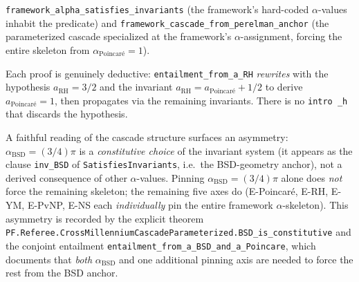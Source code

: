 \begin{definition}
\begin{itemize}
\texttt{framework\_\allowbreak{}alpha\_\allowbreak{}satisfies\_\allowbreak{}invariants} (the framework's
hard-coded $\alpha$-values inhabit the predicate) and
\texttt{framework\_\allowbreak{}cascade\_\allowbreak{}from\_\allowbreak{}perelman\_\allowbreak{}anchor} (the
parameterized cascade specialized at the framework's
$\alpha$-assignment, forcing the entire skeleton from
$\alpha_{\text{Poincar\'e}} = 1$).
\end{itemize}
Each proof is genuinely deductive: \texttt{entailment\_from\_a\_RH}
\emph{rewrites} with the hypothesis $a_{\text{RH}} = 3/2$ and the
invariant $a_{\text{RH}} = a_{\text{Poincar\'e}} + 1/2$ to derive
$a_{\text{Poincar\'e}} = 1$, then propagates via the remaining
invariants. There is no \texttt{intro \_h} that discards the
hypothesis.
\end{definition}

\begin{remark}
\label{rem:bsd-is-constitutive}
A faithful reading of the cascade structure surfaces an
asymmetry: $\alpha_{\text{BSD}} = (3/4)\pi$ is a
\emph{constitutive choice} of the invariant system (it appears as
the clause \texttt{inv\_BSD} of \texttt{SatisfiesInvariants},
i.e.\ the BSD-geometry anchor), not a derived consequence of
other $\alpha$-values. Pinning $\alpha_{\text{BSD}} = (3/4)\pi$
alone does \emph{not} force the remaining skeleton; the remaining
five axes do (E-Poincar\'e, E-RH, E-YM, E-PvNP, E-NS each
\emph{individually} pin the entire framework $\alpha$-skeleton).
This asymmetry is recorded by the explicit theorem
\texttt{PF.\allowbreak{}Referee.\allowbreak{}Cross\allowbreak{}Millennium\allowbreak{}Cascade\allowbreak{}Parameterized.BSD\_\allowbreak{}is\_\allowbreak{}constitutive}
and the conjoint entailment
\texttt{entailment\_\allowbreak{}from\_\allowbreak{}a\_\allowbreak{}BSD\_\allowbreak{}and\_\allowbreak{}a\_\allowbreak{}Poincare}, which
documents that \emph{both} $\alpha_{\text{BSD}}$ and one
additional pinning axis are needed to force the rest from the
BSD anchor.
\end{remark}

